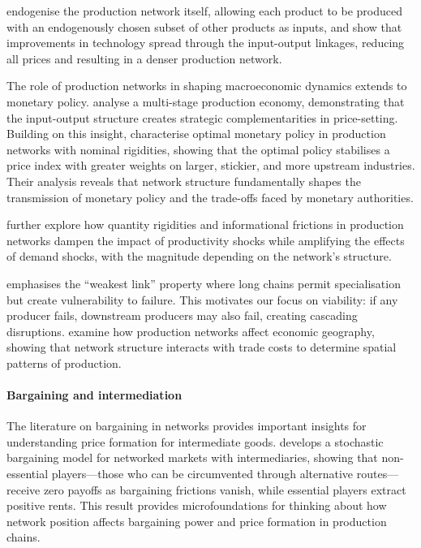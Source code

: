 \documentclass[11pt,fleqn]{article}
\begin{document}
\citet{AcemogluAzar2020} endogenise the production network itself, allowing each product to be produced with an endogenously chosen subset of other products as inputs, and show that improvements in technology spread through the input-output linkages, reducing all prices and resulting in a denser production network.

The role of production networks in shaping macroeconomic dynamics extends to monetary policy. \citet{HuangLiu2001} analyse a multi-stage production economy, demonstrating that the input-output structure creates strategic complementarities in price-setting. Building on this insight, \citet{LaOTahbazSalehi2022} characterise optimal monetary policy in production networks with nominal rigidities, showing that the optimal policy stabilises a price index with greater weights on larger, stickier, and more upstream industries. Their analysis reveals that network structure fundamentally shapes the transmission of monetary policy and the trade-offs faced by monetary authorities. 

\citet{PelletTahbazSalehi2023} further explore how quantity rigidities and informational frictions in production networks dampen the impact of productivity shocks while amplifying the effects of demand shocks, with the magnitude depending on the network's structure.

\citet{Levine2012} emphasises the ``weakest link'' property where long chains permit specialisation but create vulnerability to failure. This motivates our focus on viability: if any producer fails, downstream producers may also fail, creating cascading disruptions. \citet{Bosker2014} examine how production networks affect economic geography, showing that network structure interacts with trade costs to determine spatial patterns of production.

\paragraph{Bargaining and intermediation}

The literature on bargaining in networks provides important insights for understanding price formation for intermediate goods. \citet{Siedlarek2025} develops a stochastic bargaining model for networked markets with intermediaries, showing that non-essential players---those who can be circumvented through alternative routes---receive zero payoffs as bargaining frictions vanish, while essential players extract positive rents. This result provides microfoundations for thinking about how network position affects bargaining power and price formation in production chains.
\end{document}
